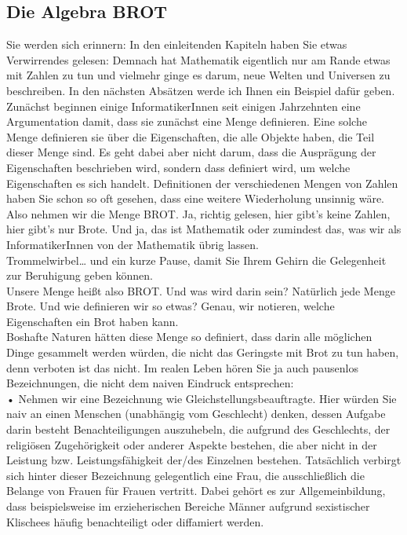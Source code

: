 \subsection{Die Algebra BROT}

Sie werden sich erinnern: In den einleitenden Kapiteln haben Sie etwas Verwirrendes gelesen: Demnach hat Mathematik eigentlich nur am Rande etwas mit Zahlen zu tun und vielmehr ginge es darum, neue Welten und Universen zu beschreiben. In den nächsten Absätzen werde ich Ihnen ein Beispiel dafür geben.\\

Zunächst beginnen einige InformatikerInnen seit einigen Jahrzehnten eine Argumentation damit, dass sie zunächst eine Menge definieren. Eine solche Menge definieren sie über die Eigenschaften, die alle Objekte haben, die Teil dieser Menge sind. Es geht dabei aber nicht darum, dass die Ausprägung der Eigenschaften beschrieben wird, sondern dass definiert wird, um welche Eigenschaften es sich handelt. Definitionen der verschiedenen Mengen von Zahlen haben Sie schon so oft gesehen, dass eine weitere Wiederholung unsinnig wäre. Also nehmen wir die Menge BROT. Ja, richtig gelesen, hier gibt’s keine Zahlen, hier gibt’s nur Brote. Und ja, das ist Mathematik oder zumindest das, was wir als InformatikerInnen von der Mathematik übrig lassen.\\

Trommelwirbel… und ein kurze Pause, damit Sie Ihrem Gehirn die Gelegenheit zur Beruhigung geben können.\\

Unsere Menge heißt also BROT. Und was wird darin sein? Natürlich jede Menge Brote. Und wie definieren wir so etwas? Genau, wir notieren, welche Eigenschaften ein Brot haben kann.\\

Boshafte Naturen hätten diese Menge so definiert, dass darin alle möglichen Dinge gesammelt werden würden, die nicht das Geringste mit Brot zu tun haben, denn verboten ist das nicht. Im realen Leben hören Sie ja auch pausenlos Bezeichnungen, die nicht dem naiven Eindruck entsprechen:\\

•	Nehmen wir eine Bezeichnung wie Gleichstellungsbeauftragte. Hier würden Sie naiv an einen Menschen (unabhängig vom Geschlecht) denken, dessen Aufgabe darin besteht Benachteiligungen auszuhebeln, die aufgrund des Geschlechts, der religiösen Zugehörigkeit oder anderer Aspekte bestehen, die aber nicht in der Leistung bzw. Leistungsfähigkeit der/des Einzelnen bestehen. Tatsächlich verbirgt sich hinter dieser Bezeichnung gelegentlich eine Frau, die ausschließlich die Belange von Frauen für Frauen vertritt. Dabei gehört es zur Allgemeinbildung, dass beispielsweise im erzieherischen Bereiche Männer aufgrund sexistischer Klischees häufig benachteiligt oder diffamiert werden.\\


